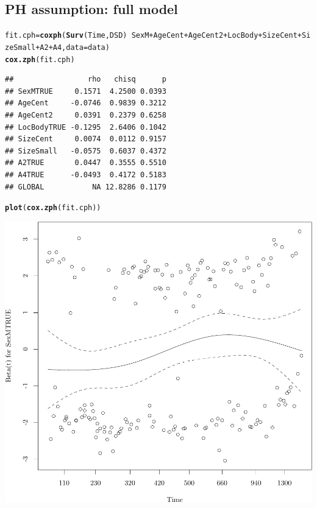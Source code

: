 \documentclass{article}\usepackage[]{graphicx}\usepackage[]{color}
\makeatletter
\def\maxwidth{ %
  \ifdim\Gin@nat@width>\linewidth
    \linewidth
  \else
    \Gin@nat@width
  \fi
}
\newcommand{\hlopt}[1]{\textcolor[rgb]{0,0,0}{#1}}%
\newcommand{\hlstd}[1]{\textcolor[rgb]{0.345,0.345,0.345}{#1}}%
\newcommand{\hlkwb}[1]{\textcolor[rgb]{0.69,0.353,0.396}{#1}}%
\newcommand{\hlkwc}[1]{\textcolor[rgb]{0.333,0.667,0.333}{#1}}%
\newcommand{\hlkwd}[1]{\textcolor[rgb]{0.737,0.353,0.396}{\textbf{#1}}}%
\newenvironment{kframe}{%
 \def\at@end@of@kframe{}%
 \ifinner\ifhmode%
  \def\at@end@of@kframe{\end{minipage}}%
  \begin{minipage}{\columnwidth}%
 \fi\fi%
 \def\FrameCommand##1{\hskip\@totalleftmargin \hskip-\fboxsep
 \colorbox{shadecolor}{##1}\hskip-\fboxsep
     \hskip-\linewidth \hskip-\@totalleftmargin \hskip\columnwidth}%
 \MakeFramed {\advance\hsize-\width
   \@totalleftmargin\z@ \linewidth\hsize
   \@setminipage}}%
 {\par\unskip\endMakeFramed%
 \at@end@of@kframe}
\newenvironment{knitrout}{}{} %
\makeatother
\begin{document}
\subsection{PH assumption: full model}
\begin{knitrout}
\color{fgcolor}\begin{kframe}
\begin{alltt}
\hlstd{fit.cph} \hlkwb{=} \hlkwd{coxph}\hlstd{(}\hlkwd{Surv}\hlstd{(Time, DSD)} \hlopt{~} \hlstd{SexM} \hlopt{+} \hlstd{AgeCent} \hlopt{+} \hlstd{AgeCent2} \hlopt{+} \hlstd{LocBody} \hlopt{+} \hlstd{SizeCent} \hlopt{+} \hlstd{SizeSmall} \hlopt{+} \hlstd{A2} \hlopt{+} \hlstd{A4,} \hlkwc{data} \hlstd{= data)}
\hlkwd{cox.zph}\hlstd{(fit.cph)}
\end{alltt}
\begin{verbatim}
##                 rho   chisq      p
## SexMTRUE     0.1571  4.2500 0.0393
## AgeCent     -0.0746  0.9839 0.3212
## AgeCent2     0.0391  0.2379 0.6258
## LocBodyTRUE -0.1295  2.6406 0.1042
## SizeCent     0.0074  0.0112 0.9157
## SizeSmall   -0.0575  0.6037 0.4372
## A2TRUE       0.0447  0.3555 0.5510
## A4TRUE      -0.0493  0.4172 0.5183
## GLOBAL           NA 12.8286 0.1179
\end{verbatim}
\begin{alltt}
\hlkwd{plot}\hlstd{(}\hlkwd{cox.zph}\hlstd{(fit.cph))}
\end{alltt}
\end{kframe}

{\centering \includegraphics[width=\maxwidth]{figure/05-eda-ph-check-full-1} 

}
\end{knitrout}
\end{document}

